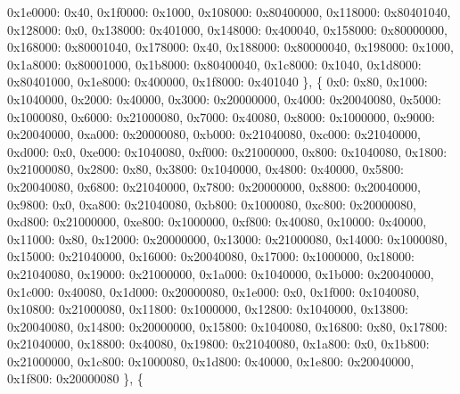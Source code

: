 \begin{DoxyCodeInclude}
            0x1e0000: 0x40,
            0x1f0000: 0x1000,
            0x108000: 0x80400000,
            0x118000: 0x80401040,
            0x128000: 0x0,
            0x138000: 0x401000,
            0x148000: 0x400040,
            0x158000: 0x80000000,
            0x168000: 0x80001040,
            0x178000: 0x40,
            0x188000: 0x80000040,
            0x198000: 0x1000,
            0x1a8000: 0x80001000,
            0x1b8000: 0x80400040,
            0x1c8000: 0x1040,
            0x1d8000: 0x80401000,
            0x1e8000: 0x400000,
            0x1f8000: 0x401040
        \},
        \{
            0x0: 0x80,
            0x1000: 0x1040000,
            0x2000: 0x40000,
            0x3000: 0x20000000,
            0x4000: 0x20040080,
            0x5000: 0x1000080,
            0x6000: 0x21000080,
            0x7000: 0x40080,
            0x8000: 0x1000000,
            0x9000: 0x20040000,
            0xa000: 0x20000080,
            0xb000: 0x21040080,
            0xc000: 0x21040000,
            0xd000: 0x0,
            0xe000: 0x1040080,
            0xf000: 0x21000000,
            0x800: 0x1040080,
            0x1800: 0x21000080,
            0x2800: 0x80,
            0x3800: 0x1040000,
            0x4800: 0x40000,
            0x5800: 0x20040080,
            0x6800: 0x21040000,
            0x7800: 0x20000000,
            0x8800: 0x20040000,
            0x9800: 0x0,
            0xa800: 0x21040080,
            0xb800: 0x1000080,
            0xc800: 0x20000080,
            0xd800: 0x21000000,
            0xe800: 0x1000000,
            0xf800: 0x40080,
            0x10000: 0x40000,
            0x11000: 0x80,
            0x12000: 0x20000000,
            0x13000: 0x21000080,
            0x14000: 0x1000080,
            0x15000: 0x21040000,
            0x16000: 0x20040080,
            0x17000: 0x1000000,
            0x18000: 0x21040080,
            0x19000: 0x21000000,
            0x1a000: 0x1040000,
            0x1b000: 0x20040000,
            0x1c000: 0x40080,
            0x1d000: 0x20000080,
            0x1e000: 0x0,
            0x1f000: 0x1040080,
            0x10800: 0x21000080,
            0x11800: 0x1000000,
            0x12800: 0x1040000,
            0x13800: 0x20040080,
            0x14800: 0x20000000,
            0x15800: 0x1040080,
            0x16800: 0x80,
            0x17800: 0x21040000,
            0x18800: 0x40080,
            0x19800: 0x21040080,
            0x1a800: 0x0,
            0x1b800: 0x21000000,
            0x1c800: 0x1000080,
            0x1d800: 0x40000,
            0x1e800: 0x20040000,
            0x1f800: 0x20000080
        \},
        \{

\end{DoxyCodeInclude}
